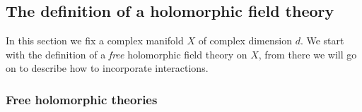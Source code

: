 \documentclass[10pt]{amsart}
\begin{document}
%
%
%
%

\subsection{The definition of a holomorphic field theory}

In this section we fix a complex manifold $X$ of complex dimension $d$. 
We start with the definition of a {\em free} holomorphic field theory on $X$, from there we will go on to describe how to incorporate interactions. 

\subsubsection{Free holomorphic theories}
\end{document}
